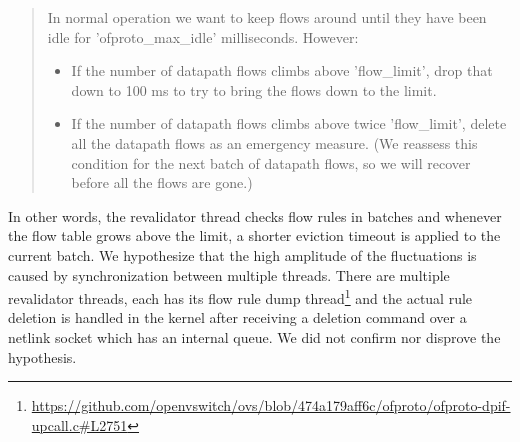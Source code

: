\begin{quote}
    In normal operation we want to keep flows around until they have
    been idle for 'ofproto\_max\_idle' milliseconds.  However:

    \begin{itemize}
        \item If the number of datapath flows climbs above 'flow\_limit', drop that down to 100 ms to try to bring the flows down to the limit.

        \item If the number of datapath flows climbs above twice 'flow\_limit', delete all the datapath flows as an emergency measure.  (We reassess this condition for the next batch of datapath flows, so we will recover before all the flows are gone.)
    \end{itemize}
\end{quote}

In other words, the revalidator thread checks flow rules in batches and whenever the flow table grows above the limit, a shorter eviction timeout is applied to the current batch. We hypothesize that the high amplitude of the fluctuations is caused by synchronization between multiple threads. There are multiple revalidator threads, each has its flow rule dump thread\footnote{\url{https://github.com/openvswitch/ovs/blob/474a179aff6c/ofproto/ofproto-dpif-upcall.c\#L2751}} and the actual rule deletion is handled in the kernel after receiving a deletion command over a netlink socket which has an internal queue. We did not confirm nor disprove the hypothesis.

% 

